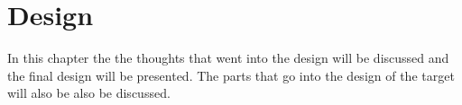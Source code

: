 \chapter{Design}
In this chapter the the thoughts that went into the design will be discussed and
the final design will be presented. The parts that go into the design of the
target will also be also be discussed.


